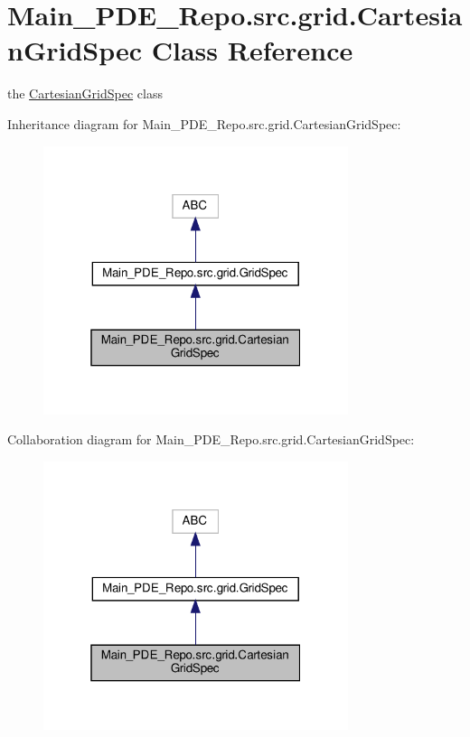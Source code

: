 \hypertarget{classMain__PDE__Repo_1_1src_1_1grid_1_1CartesianGridSpec}{}\section{Main\+\_\+\+P\+D\+E\+\_\+\+Repo.\+src.\+grid.\+Cartesian\+Grid\+Spec Class Reference}
\label{classMain__PDE__Repo_1_1src_1_1grid_1_1CartesianGridSpec}


the \hyperlink{classMain__PDE__Repo_1_1src_1_1grid_1_1CartesianGridSpec}{Cartesian\+Grid\+Spec} class  




Inheritance diagram for Main\+\_\+\+P\+D\+E\+\_\+\+Repo.\+src.\+grid.\+Cartesian\+Grid\+Spec\+:
\nopagebreak
\begin{figure}[H]
\begin{center}
\leavevmode
\includegraphics[width=253pt]{classMain__PDE__Repo_1_1src_1_1grid_1_1CartesianGridSpec__inherit__graph}
\end{center}
\end{figure}


Collaboration diagram for Main\+\_\+\+P\+D\+E\+\_\+\+Repo.\+src.\+grid.\+Cartesian\+Grid\+Spec\+:
\nopagebreak
\begin{figure}[H]
\begin{center}
\leavevmode
\includegraphics[width=253pt]{classMain__PDE__Repo_1_1src_1_1grid_1_1CartesianGridSpec__coll__graph}
\end{center}
\end{figure}
